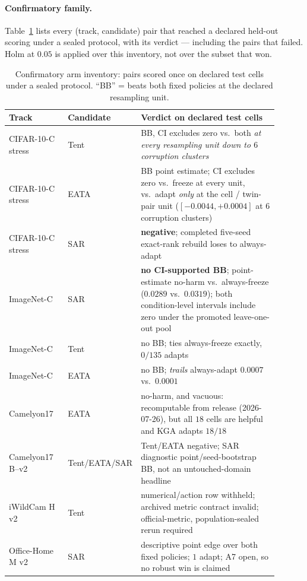 \paragraph{Confirmatory family.} Table~\ref{tab:arm-inventory} lists every (track, candidate) pair
that reached a declared held-out scoring under a sealed protocol, with its verdict --- including the
pairs that failed. Holm at $0.05$ is applied over this inventory, not over the subset that won.

\begin{table}[t]\centering\footnotesize
\caption{Confirmatory arm inventory: pairs scored once on declared test cells under a sealed
protocol. ``BB'' = beats both fixed policies at the declared resampling unit.}
\label{tab:arm-inventory}
\begin{tabular}{@{}p{0.22\linewidth}p{0.16\linewidth}p{0.52\linewidth}@{}}
\toprule
Track & Candidate & Verdict on declared test cells \\
\midrule
CIFAR-10-C stress & Tent & BB, CI excludes zero vs.\ both \emph{at every resampling unit down to $6$ corruption clusters} \\
CIFAR-10-C stress & EATA & BB point estimate; CI excludes zero vs.\ freeze at every unit, vs.\ adapt \emph{only} at the cell / twin-pair unit ($[-0.0044,+0.0004]$ at $6$ corruption clusters) \\
CIFAR-10-C stress & SAR & \textbf{negative}; completed five-seed exact-rank rebuild loses to always-adapt \\
ImageNet-C & SAR & \textbf{no CI-supported BB}; point-estimate no-harm vs.\ always-freeze ($0.0289$ vs.\ $0.0319$); both condition-level intervals include zero under the promoted leave-one-out pool \\
ImageNet-C & Tent & no BB; ties always-freeze exactly, $0/135$ adapts \\
ImageNet-C & EATA & no BB; \emph{trails} always-adapt $0.0007$ vs.\ $0.0001$ \\
Camelyon17 & EATA & no-harm, and vacuous: recomputable from release (2026-07-26), but all $18$ cells are helpful and KGA adapts $18/18$ \\
Camelyon17 B--v2 & Tent/EATA/SAR & Tent/EATA negative; SAR diagnostic point/seed-bootstrap BB, not an untouched-domain headline \\
iWildCam H v2 & Tent & numerical/action row withheld; archived metric contract invalid; official-metric, population-sealed rerun required \\
Office-Home M v2 & SAR & descriptive point edge over both fixed policies; $1$ adapt; A7 open, so no robust win is claimed \\

\end{tabular}
\end{table}
